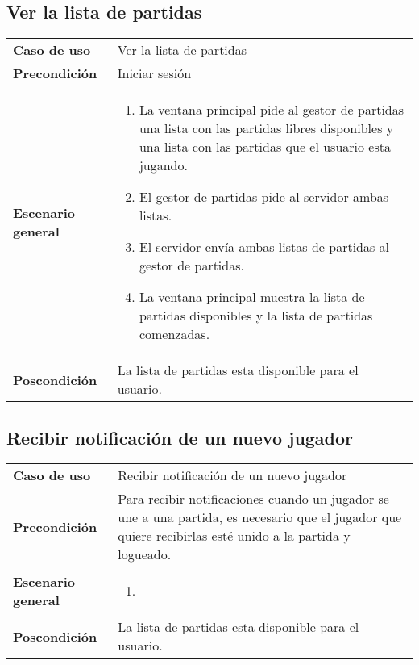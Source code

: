 \subsection{Ver la lista de partidas}

{\footnotesize
\begin{tabularx}{0.95\textwidth}{p{}|X}

\textbf{Caso de uso} & Ver la lista de partidas \\

\textbf{Precondición} & Iniciar sesión \\

\textbf{Escenario general} & \begin{enumerate}
\item La ventana principal pide al gestor de partidas una lista con las
partidas libres disponibles y una lista con las partidas que el usuario esta
jugando.
\item El gestor de partidas pide al servidor ambas listas.
\item El servidor envía ambas listas de partidas al gestor de partidas.
\item La ventana principal muestra la lista de partidas disponibles y la lista
de partidas comenzadas.

\end{enumerate} \\

\textbf{Poscondición} & La lista de partidas esta disponible para el usuario.

\end{tabularx}
}



\subsection{Recibir notificación de un nuevo jugador}

{\footnotesize
\begin{tabularx}{0.95\textwidth}{p{}|X}

\textbf{Caso de uso} & Recibir notificación de un nuevo jugador \\

\textbf{Precondición} & Para recibir notificaciones cuando un jugador se une a
una partida, es necesario que el jugador que quiere recibirlas esté unido a la
partida y logueado. \\

\textbf{Escenario general} & \begin{enumerate}
\item 

\end{enumerate} \\

\textbf{Poscondición} & La lista de partidas esta disponible para el usuario.

\end{tabularx}
}

